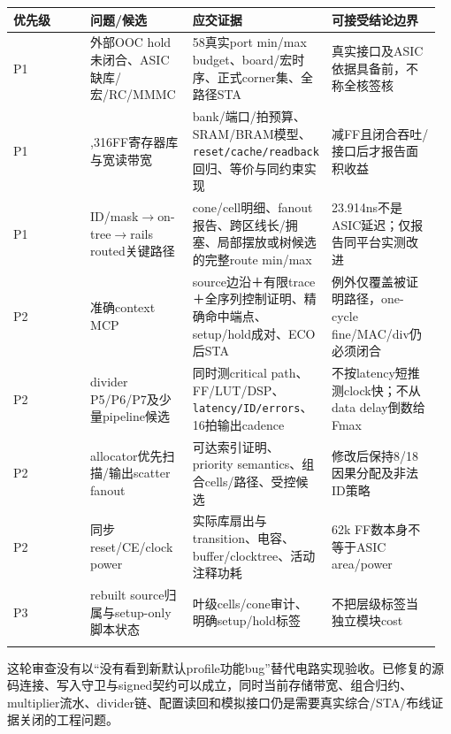 \documentclass[UTF8,fontset=fandol,10pt,a4paper,openany]{ctexrep}
\newcommand{\code}[1]{\nolinkurl{#1}}
\begin{document}
\begingroup\small\setlength{\tabcolsep}{2pt}\renewcommand{\arraystretch}{1.25}\begin{longtable}{@{}>{\raggedright\arraybackslash}p{0.19\linewidth}>{\raggedright\arraybackslash}p{0.24\linewidth}>{\raggedright\arraybackslash}p{0.27\linewidth}>{\raggedright\arraybackslash}p{0.26\linewidth}@{}}
\toprule
\textbf{优先级} & \textbf{问题/候选} & \textbf{应交证据} & \textbf{可接受结论边界}\\\midrule\endhead
P1 & 外部OOC hold未闭合、ASIC缺库/宏/RC/MMMC & 58真实port min/max budget、board/宏时序、正式corner集、全路径STA & 真实接口及ASIC依据具备前，不称全核签核\\\addlinespace[2pt]
P1 & 62,316FF寄存器库与宽读带宽 & bank/端口/拍预算、SRAM/BRAM模型、\code{reset/cache/readback}回归、等价与同约束实现 & 减FF且闭合吞吐/接口后才报告面积收益\\\addlinespace[2pt]
P1 & ID/mask\ensuremath{\rightarrow}on-tree\ensuremath{\rightarrow}rails routed关键路径 & cone/cell明细、fanout报告、跨区线长/拥塞、局部摆放或树候选的完整route min/max & 23.914ns不是ASIC延迟；仅报告同平台实测改进\\\addlinespace[2pt]
P2 & 准确context MCP & source边沿＋有限trace＋全序列控制证明、精确命中端点、setup/hold成对、ECO后STA & 例外仅覆盖被证明路径，one-cycle fine/MAC/div仍必须闭合\\\addlinespace[2pt]
P2 & divider P5/P6/P7及少量pipeline候选 & 同时测critical path、FF/LUT/DSP、\code{latency/ID/errors}、16拍输出cadence & 不按latency短推测clock快；不从data delay倒数给Fmax\\\addlinespace[2pt]
P2 & allocator优先扫描/输出scatter fanout & 可达索引证明、priority semantics、组合cells/路径、受控候选 & 修改后保持8/18因果分配及非法ID策略\\\addlinespace[2pt]
P2 & 同步reset/CE/clock power & 实际库扇出与transition、电容、buffer/clocktree、活动注释功耗 & 62k FF数本身不等于ASIC area/power\\\addlinespace[2pt]
P3 & rebuilt source归属与setup-only脚本状态 & 叶级cells/cone审计、明确setup/hold标签 & 不把层级标签当独立模块cost\\\addlinespace[2pt]
\bottomrule\end{longtable}\endgroup


这轮审查没有以“没有看到新默认profile功能bug”替代电路实现验收。已修复的源码连接、写入守卫与signed契约可以成立，同时当前存储带宽、组合归约、multiplier流水、divider链、配置读回和模拟接口仍是需要真实综合/STA/布线证据关闭的工程问题。
\end{document}
